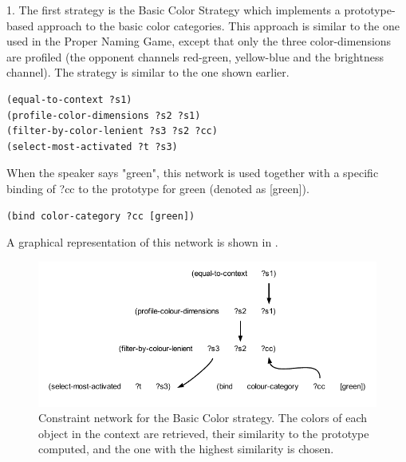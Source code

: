 1. The first strategy is the {\bfshape Basic Color Strategy} which implements a prototype-based approach to 
the basic color categories. This approach is similar to the one used in the Proper Naming Game, except that 
only the three color-dimensions are profiled (the opponent channels red-green, yellow-blue and the brightness channel). 
The strategy is similar to the one shown earlier. 
\begin{verbatim}
(equal-to-context ?s1) 
(profile-color-dimensions ?s2 ?s1)
(filter-by-color-lenient ?s3 ?s2 ?cc)
(select-most-activated ?t ?s3)
\end{verbatim}
When the speaker says "green", this network is used together with a specific binding of ?cc to the prototype for 
green (denoted as [green]). 
\begin{verbatim}
(bind color-category ?cc [green])
\end{verbatim}
A graphical representation of this network is shown in . 
\begin{figure}[htbp]
  \centerline{\includegraphics[width=1.0\textwidth]{chap11/figs/basic-strat}}
\caption{\label{fig:basic-strat} 
Constraint network for the Basic Color strategy. The colors of each object in the context are retrieved, their 
similarity to the prototype computed, and the one with the highest similarity is chosen.}
\end{figure}


